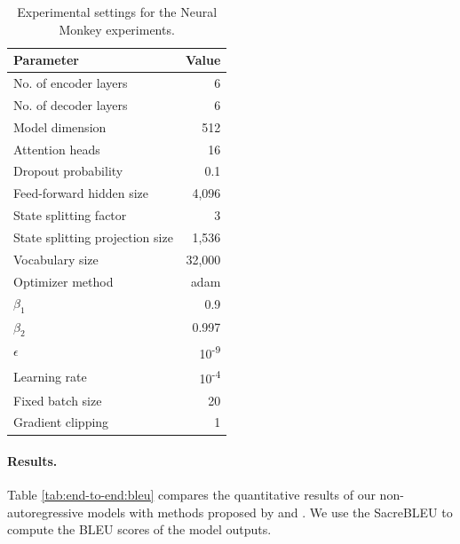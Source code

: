 \begin{table}
  \centering
  \begin{tabular}{lr}
    \toprule
    Parameter & Value \\
    \midrule
    No. of encoder layers & 6 \\
    No. of decoder layers & 6 \\
    Model dimension & 512 \\
    Attention heads & 16 \\
    Dropout probability & 0.1 \\
    Feed-forward hidden size & 4,096 \\
    State splitting factor & 3 \\
    State splitting projection size & 1,536 \\
    Vocabulary size & 32,000 \\
    \midrule
    Optimizer method & adam \\
    $\beta_1$ & 0.9 \\
    $\beta_2$ & 0.997 \\
    $\epsilon$ & 10\textsuperscript{-9} \\
    Learning rate & 10\textsuperscript{-4} \\
    Fixed batch size & 20 \\
    Gradient clipping & 1 \\
    \bottomrule
  \end{tabular}

  \caption{Experimental settings for the Neural Monkey experiments.}%
  \label{tab:end-to-end:hparams}
\end{table}

\paragraph{Results.} Table \ref{tab:end-to-end:bleu} compares the quantitative
results of our non-autoregressive models with methods proposed by
\citet{gu2017nonautoregressive} and \citet{lee-etal-2018-deterministic}. We use
the SacreBLEU \citep{post-2018-call} to compute the BLEU scores of the model
outputs.

